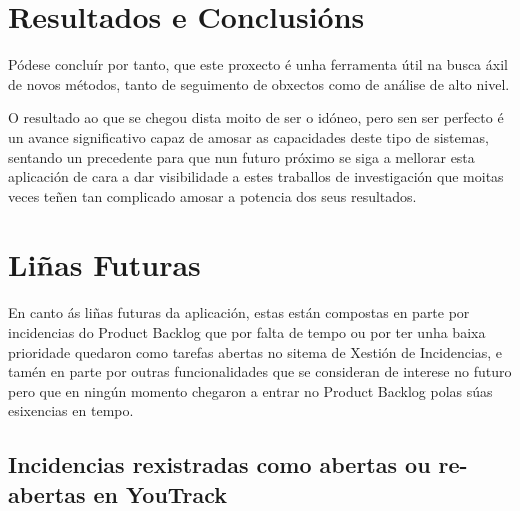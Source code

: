 \chapter{Resultados e Conclusións}

Pódese concluír por tanto, que este proxecto é unha ferramenta útil na busca áxil de novos métodos,
tanto de seguimento de obxectos como de análise de alto nivel.

O resultado ao que se chegou dista moito de ser o idóneo, pero sen ser perfecto é un avance 
significativo capaz de amosar as capacidades deste tipo de sistemas, sentando un precedente para
que nun futuro próximo se siga a mellorar esta aplicación de cara a dar visibilidade a estes 
traballos de investigación que moitas veces teñen tan complicado amosar a potencia dos seus 
resultados.

\chapter{Liñas Futuras}
\label{sec:linhasFuturas}
    En canto ás liñas futuras da aplicación, estas están compostas en parte por incidencias do 
    Product Backlog que por falta de tempo ou por ter unha baixa prioridade quedaron como tarefas 
    abertas no sitema de Xestión de Incidencias, e tamén en parte por outras funcionalidades que se
    consideran de interese no futuro pero que en ningún momento chegaron a entrar no Product Backlog
    polas súas esixencias en tempo.
    
    \section{Incidencias rexistradas como abertas ou re-abertas en YouTrack}
    
